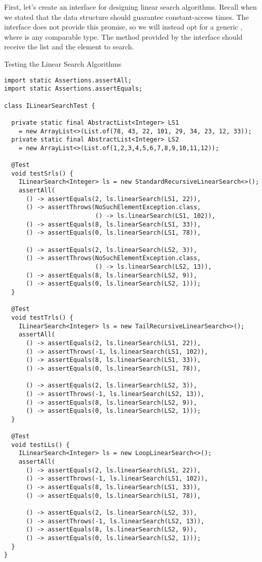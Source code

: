 First, let's create an interface for designing linear search algorithms. Recall when we stated that the data structure should guarantee constant-access times. The  interface does not provide this promise, so we will instead opt for a generic , where  is any comparable type. The method provided by the interface should receive the list and the element to search.

\begin{cl}[]{Testing the Linear Search Algorithms}
\begin{lstlisting}[language=MyJava]
import static Assertions.assertAll;
import static Assertions.assertEquals;

class ILinearSearchTest {

  private static final AbstractList<Integer> LS1 
    = new ArrayList<>(List.of(78, 43, 22, 101, 29, 34, 23, 12, 33));
  private static final AbstractList<Integer> LS2 
    = new ArrayList<>(List.of(1,2,3,4,5,6,7,8,9,10,11,12));

  @Test
  void testSrls() {
    ILinearSearch<Integer> ls = new StandardRecursiveLinearSearch<>();
    assertAll(
      () -> assertEquals(2, ls.linearSearch(LS1, 22)),
      () -> assertThrows(NoSuchElementException.class, 
                         () -> ls.linearSearch(LS1, 102)),
      () -> assertEquals(8, ls.linearSearch(LS1, 33)),
      () -> assertEquals(0, ls.linearSearch(LS1, 78)),

      () -> assertEquals(2, ls.linearSearch(LS2, 3)),
      () -> assertThrows(NoSuchElementException.class, 
                         () -> ls.linearSearch(LS2, 13)),
      () -> assertEquals(8, ls.linearSearch(LS2, 9)),
      () -> assertEquals(0, ls.linearSearch(LS2, 1)));
  }

  @Test
  void testTrls() {
    ILinearSearch<Integer> ls = new TailRecursiveLinearSearch<>();
    assertAll(
      () -> assertEquals(2, ls.linearSearch(LS1, 22)),
      () -> assertThrows(-1, ls.linearSearch(LS1, 102)),
      () -> assertEquals(8, ls.linearSearch(LS1, 33)),
      () -> assertEquals(0, ls.linearSearch(LS1, 78)),

      () -> assertEquals(2, ls.linearSearch(LS2, 3)),
      () -> assertThrows(-1, ls.linearSearch(LS2, 13)),
      () -> assertEquals(8, ls.linearSearch(LS2, 9)),
      () -> assertEquals(0, ls.linearSearch(LS2, 1)));
  }

  @Test
  void testLLs() {
    ILinearSearch<Integer> ls = new LoopLinearSearch<>();
    assertAll(
      () -> assertEquals(2, ls.linearSearch(LS1, 22)),
      () -> assertThrows(-1, ls.linearSearch(LS1, 102)),
      () -> assertEquals(8, ls.linearSearch(LS1, 33)),
      () -> assertEquals(0, ls.linearSearch(LS1, 78)),

      () -> assertEquals(2, ls.linearSearch(LS2, 3)),
      () -> assertThrows(-1, ls.linearSearch(LS2, 13)),
      () -> assertEquals(8, ls.linearSearch(LS2, 9)),
      () -> assertEquals(0, ls.linearSearch(LS2, 1)));
  }
}
\end{lstlisting}
\end{cl}

